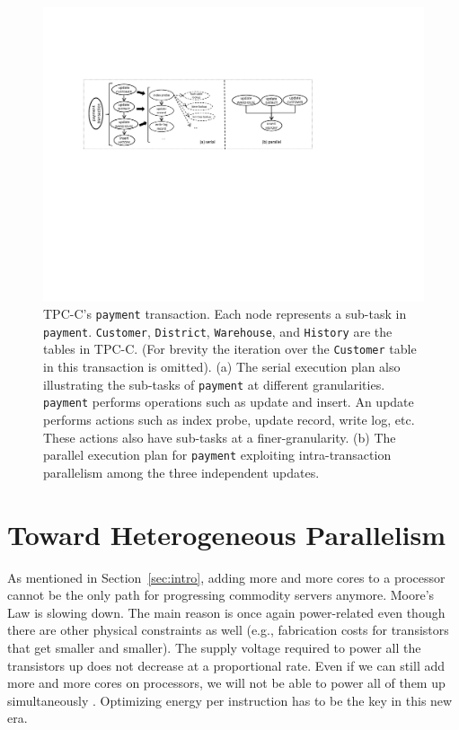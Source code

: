 \documentclass[11pt,dvipdfm]{article}
\newcommand{\refsec}[1]{Section~\ref{sec:#1}}
\begin{document}
\begin{figure}
\centering
\includegraphics{figs/fig-intrataskgran.pdf}
\caption{TPC-C's \texttt{payment} transaction.
Each node represents a sub-task in \texttt{payment}.
\texttt{Customer}, \texttt{District}, \texttt{Warehouse}, and \texttt{History} are the tables in TPC-C.
(For brevity the iteration over the \texttt{Customer} table in this transaction is omitted).
(a) The serial execution plan also illustrating the sub-tasks of \texttt{payment} at different granularities.
\texttt{payment} performs operations such as update and insert.
An update performs actions such as index probe, update record, write log, etc.
These actions also have sub-tasks at a finer-granularity.
(b) The parallel execution plan for \texttt{payment}
exploiting intra-transaction parallelism among the three independent updates.}
\label{fig:intratask}
\end{figure}

\section{Toward Heterogeneous Parallelism}
\label{sec:het}

As mentioned in \refsec{intro},
adding more and more cores to a processor cannot be the only path for progressing commodity servers anymore.
Moore's Law is slowing down.
The main reason is once again power-related even though there are other physical constraints as well
(e.g., fabrication costs for transistors that get smaller and smaller).
The supply voltage required to power all the transistors up does not decrease at a proportional rate.
Even if we can still add more and more cores on processors,
we will not be able to power all of them up simultaneously \cite{EsmaeilzadehBASB11}.
Optimizing energy per instruction has to be the key in this new era.
\end{document}
